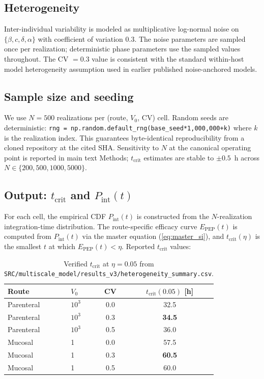 \documentclass[11pt]{article}
\theoremstyle{definition}
\theoremstyle{remark}
\newcommand{\Pint}{P_{\text{int}}}
\newcommand{\Epep}{E_{\text{PEP}}}
\newcommand{\tcrit}{t_{\text{crit}}}
\begin{document}
\subsection{Heterogeneity}

Inter-individual variability is modeled as multiplicative log-normal noise on $\{\beta, c, \delta, \alpha\}$ with coefficient of variation $0.3$. The noise parameters are sampled once per realization; deterministic phase parameters use the sampled values throughout. The CV $= 0.3$ value is consistent with the standard within-host model heterogeneity assumption used in earlier published noise-anchored models.

\subsection{Sample size and seeding}

We use $N = 500$ realizations per (route, $V_{0}$, CV) cell. Random seeds are deterministic: \texttt{rng = np.random.default\_rng(base\_seed*1{,}000{,}000+k)} where $k$ is the realization index. This guarantees byte-identical reproducibility from a cloned repository at the cited SHA. Sensitivity to $N$ at the canonical operating point is reported in main text Methods; $\tcrit$ estimates are stable to $\pm 0.5$~h across $N \in \{200, 500, 1000, 5000\}$.

\subsection{Output: \texorpdfstring{$\tcrit$}{tcrit} and \texorpdfstring{$\Pint(t)$}{Pint(t)}}

For each cell, the empirical CDF $\Pint(t)$ is constructed from the $N$-realization integration-time distribution. The route-specific efficacy curve $\Epep(t)$ is computed from $\Pint(t)$ via the master equation (\ref{eq:master_si}), and $\tcrit(\eta)$ is the smallest $t$ at which $\Epep(t) < \eta$. Reported $\tcrit$ values:

\begin{table}[H]
\centering
\small
\caption{Verified $\tcrit$ at $\eta = 0.05$ from \texttt{SRC/multiscale\_model/results\_v3/heterogeneity\_summary.csv}.}
\begin{tabular}{@{}llcc@{}}
\toprule
\textbf{Route} & \textbf{$V_{0}$} & \textbf{CV} & \textbf{$\tcrit(0.05)$ [h]} \\
\midrule
Parenteral  & $10^{3}$ & 0.0 & 32.5 \\
Parenteral  & $10^{3}$ & 0.3 & \textbf{34.5} \\
Parenteral  & $10^{3}$ & 0.5 & 36.0 \\
Mucosal     & 1        & 0.0 & 57.5 \\
Mucosal     & 1        & 0.3 & \textbf{60.5} \\
Mucosal     & 1        & 0.5 & 60.0 \\
\bottomrule
\end{tabular}
\end{table}
\end{document}
